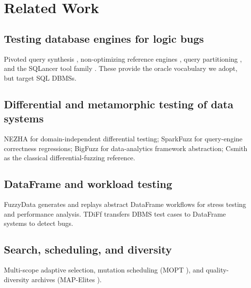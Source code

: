 \section{Related Work}
\label{sec:related}


\subsection{Testing database engines for logic bugs}
Pivoted query synthesis \cite{rigger2020pqs}, non-optimizing reference engines
\cite{rigger2020norec}, query partitioning \cite{rigger2020tlp}, and the SQLancer tool family
\cite{rigger2020sqlancer}. These provide the oracle vocabulary we adopt, but target SQL DBMSs.

\subsection{Differential and metamorphic testing of data systems}
NEZHA \cite{rui2017nezha} for domain-independent differential testing; SparkFuzz
\cite{sparkfuzz2020} for query-engine correctness regressions; BigFuzz \cite{bigfuzz2020} for
data-analytics framework abstraction; Csmith \cite{yang2011csmith} as the classical
differential-fuzzing reference. 

\subsection{DataFrame and workload testing}
FuzzyData \cite{rehman2022fuzzydata} generates and replays abstract DataFrame workflows for
stress testing and performance analysis. TDiFf \cite{tdiff2026} transfers DBMS test cases to
DataFrame systems to detect bugs. 

\subsection{Search, scheduling, and diversity}
Multi-scope adaptive selection, mutation scheduling (MOPT \cite{mopt2019}), and quality-diversity
archives (MAP-Elites \cite{mouret2015mapelites}). 

